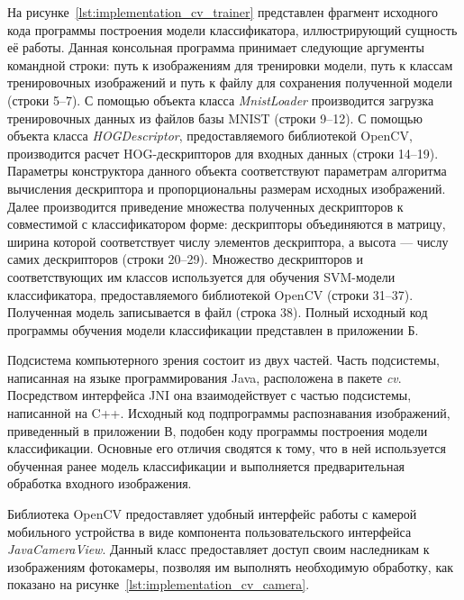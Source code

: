 На рисунке~\ref{lst:implementation_cv_trainer} представлен фрагмент
исходного кода программы построения модели классификатора,
иллюстрирующий сущность её работы.
Данная консольная программа принимает следующие аргументы командной
строки: путь к изображениям для тренировки модели,
путь к классам тренировочных изображений и
путь к файлу для сохранения полученной модели (строки 5--7).
С помощью объекта класса \textit{MnistLoader} производится загрузка
тренировочных данных из файлов базы MNIST (строки 9--12).
С помощью объекта класса \textit{HOGDescriptor}, предоставляемого
библиотекой OpenCV, производится расчет HOG-дескрипторов для
входных данных (строки 14--19). Параметры конструктора данного объекта
соответствуют параметрам алгоритма вычисления дескриптора
и пропорциональны размерам исходных изображений.
Далее производится приведение множества полученных дескрипторов
к совместимой с классификатором форме:
дескрипторы объединяются в матрицу, ширина которой
соответствует числу элементов дескриптора, а высота ---
числу самих дескрипторов (строки 20--29).
Множество дескрипторов и соответствующих им классов используется
для обучения SVM-модели классификатора, предоставляемого библиотекой
OpenCV (строки 31--37).
Полученная модель записывается в файл (строка 38).
Полный исходный код программы обучения модели классификации представлен
в приложении Б.



Подсистема компьютерного зрения состоит из двух частей.
Часть подсистемы, написанная на языке
программирования Java, расположена в пакете \textit{cv}. Посредством
интерфейса JNI она взаимодействует с частью подсистемы, написанной на C++.
Исходный код подпрограммы распознавания изображений, приведенный в приложении В,
подобен коду программы построения модели классификации.
Основные его отличия сводятся к тому,
что в ней используется обученная ранее модель классификации и
выполняется предварительная обработка входного изображения.

Библиотека OpenCV предоставляет удобный интерфейс работы с камерой
мобильного устройства в виде компонента пользовательского интерфейса
\textit{JavaCameraView}.
Данный класс предоставляет доступ своим наследникам
к изображениям фотокамеры, позволяя им выполнять
необходимую обработку, как показано на рисунке~\ref{lst:implementation_cv_camera}.



